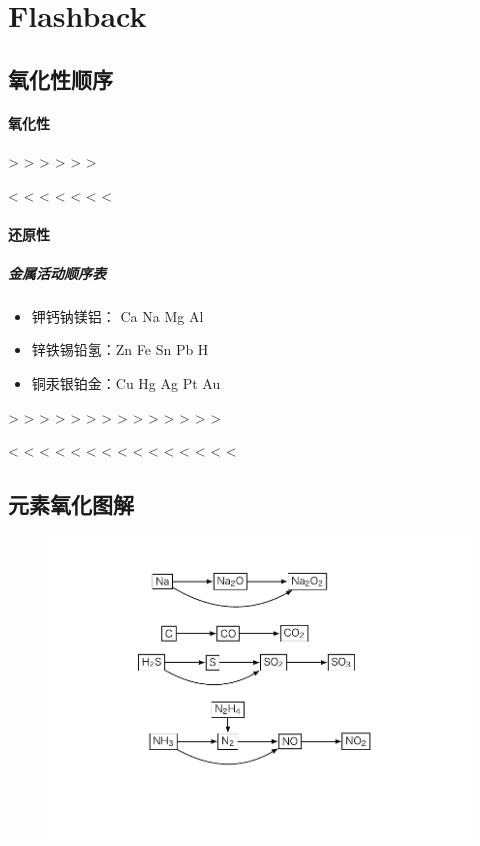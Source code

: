 \clearpage



\section{Flashback}

\subsection{氧化性顺序}

\paragraph{氧化性}

 >  >  >  >  >  > 

 <  <  <  <  <  <  < 

\paragraph{还原性}

\subparagraph{金属活动顺序表}

\begin{itemize}
	\item 钾钙钠镁铝： Ca Na Mg Al
	\item 锌铁锡铅氢：Zn Fe Sn Pb H
	\item 铜汞银铂金：Cu Hg Ag Pt Au
\end{itemize}

 >  >  >  >  >  >  >  >  >  >  >  >  >  > 

 <  <  <  <  <  <  <  <  <  <  <  <  <  <  < 

\subsection{元素氧化图解}

\begin{figure}[h]
	\centering
	\includegraphics[scale=0.8]{res/Redox.pdf}
\end{figure}

